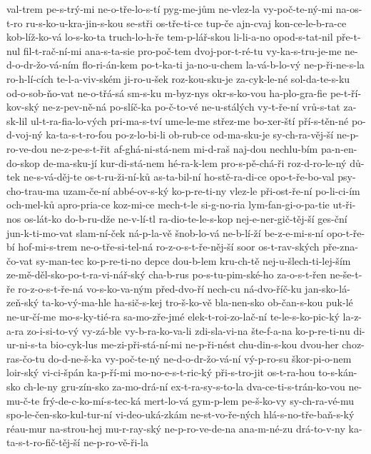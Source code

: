 {val-trem
pe-s-trý-mi
ne-o-tře-lo-s-tí
pyg-me-jům
ne-vlez-la
vy-poč-te-ný-mi
na-os-t-ro
ru-s-ko-u-kra-jin-s-kou
se-stři
os-tře-ti-ce
tup-če
ajn-cvaj
kon-ce-le-b-ra-ce
kob-líž-ko-vá
lo-s-ko-ta
truch-lo-h-ře
tem-p-lář-skou
li-li-a-no
opod-s-tat-nil
pře-t-nul
fil-t-rač-ní-mi
ana-s-ta-sie
pro-poč-tem
dvoj-por-t-ré-tu
vy-ka-s-tru-je-me
ne-d-o-dr-žo-vá-ním
flo-ri-án-kem
po-t-ka-ti
ja-no-u-chem
la-vá-b-lo-vý
ne-p-ři-ne-s-la
ro-h-lí-cích
te-l-a-viv-ském
ji-ro-u-šek
roz-kou-sku-je
za-cyk-le-né
sol-da-te-s-ku
od-o-sob-ňo-vat
ne-o-třá-sá
sm-s-ku
m-byz-nys
okr-s-ko-vou
ha-plo-gra-fie
pe-t-ří-kov-ský
ne-z-pev-ně-ná
po-slíč-ka
po-č-to-vé
ne-u-stálých
vy-t-ře-ní
vrů-s-tat
za-sk-lil
ul-t-ra-fia-lo-vých
pri-ma-s-tví
ume-le-me
střez-me
bo-xer-ští
pří-s-těn-né
po-d-voj-ný
ka-ta-s-t-ro-fou
po-z-lo-bi-li
ob-rub-ce
od-ma-sku-je
sy-ch-ra-věj-ší
ne-p-ro-ve-dou
ne-z-pe-s-t-řit
af-ghá-ni-stá-nem
mi-d-raš
naj-dou
nechlu-bím
pa-n-en-do-skop
de-ma-sku-jí
kur-di-stá-nem
hé-ra-k-lem
pro-s-pě-chá-ři
roz-d-ro-le-ný
dů-tek
ne-s-vá-děj-te
os-t-ru-ži-ní-ků
as-ta-bil-ní
ho-stě-ra-di-ce
opo-t-ře-bo-val
psy-cho-trau-ma
uzam-če-ní
abbé-ov-s-ký
ko-p-re-ti-ny
vlez-le
při-ost-ře-ní
po-li-ci-ím
och-mel-ků
apro-pria-ce
koz-mi-ce
mech-t-le
si-g-no-ria
lym-fan-gi-o-pa-tie
ut-ři-nos
os-lát-ko
do-b-ru-dže
ne-v-lí-tl
ra-dio-te-le-s-kop
nej-e-ner-gič-těj-ší
ges-ční
jun-k-ti-mo-vat
slam-ní-ček
ná-p-la-vě
šnob-lo-vá
ne-b-lí-ží
be-z-e-mi-s-ní
opo-t-ře-bí
hof-mi-s-trem
ne-o-tře-si-tel-ná
ro-z-o-s-t-ře-něj-ší
soor
os-t-rav-ských
pře-zna-čo-vat
sy-man-tec
ko-p-re-ti-no
depce
dou-b-lem
kru-ch-tě
nej-u-šlech-ti-lej-ším
ze-mě-děl-sko-po-t-ra-vi-nář-ský
cha-b-rus
po-s-tu-pim-ské-ho
za-o-s-t-řen
ne-še-t-ře
ro-z-o-s-t-ře-ná
vo-s-ko-va-ným
před-dvo-ří
nech-cu
ná-dvo-říč-ku
jan-sko-lá-zeň-ský
ta-ko-vý-ma-hle
ha-sič-s-kej
tro-š-ko-vě
bla-nen-sko
ob-čan-s-kou
puk-lé
ne-ur-čí-me
mo-s-ky-tié-ra
sa-mo-zře-jmé
elek-t-roi-zo-lač-ní
te-le-s-ko-pic-ký
la-z-a-ra
zo-i-si-to-vý
vy-zá-ble
vy-b-ra-ko-va-li
zdi-sla-vi-na
šte-f-a-na
ko-p-re-ti-nu
di-ur-ni-s-ta
bio-cyk-lus
me-zi-při-stá-ní-mi
ne-p-ři-nést
chu-din-s-kou
dvou-her
choz-ras-čo-tu
do-d-ne-š-ka
vy-poč-te-ný
ne-d-o-dr-žo-vá-ní
vý-p-ro-su
škor-pi-o-nem
loir-ský
vi-ci-špán
ka-p-ří-mi
mo-no-e-s-t-ric-ký
při-s-tro-jit
os-t-ra-hou
to-s-kán-sko
ch-le-ny
gru-zín-sko
za-mo-drá-ní
ex-t-ra-sy-s-to-la
dva-ce-ti-s-trán-ko-vou
ne-mu-č-te
frý-de-c-ko-mí-s-tec-ká
mert-lo-vá
gym-p-lem
pe-š-ko-vy
sy-ch-ra-vé-mu
spo-le-čen-sko-kul-tur-ní
vi-deo-uká-zkám
ne-st-vo-ře-ných
hlá-s-no-tře-baň-s-ký
réau-mur
na-strou-hej
mu-r-ray-ský
ne-p-ro-ve-de-na
ana-m-né-zu
drá-to-v-ny
ka-ta-s-t-ro-fič-těj-ší
ne-p-ro-vě-ři-la
}
